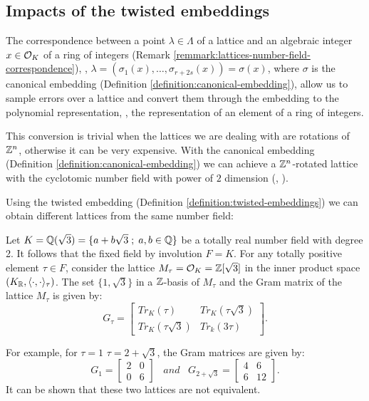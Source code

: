 \documentclass[a4paper,12pt]{article}
\begin{document}
\subsection{Impacts of the twisted embeddings}
\label{sec:org032194b}

   \begin{text}
  The correspondence between a point $\lambda \in \Lambda$ of a lattice and an algebraic
  integer $x \in \mathcal{O}_K$ of a ring of integers (Remark \ref{remmark:lattices-number-field-correspondence}),
  \ie, $\lambda = (\sigma_1(x), \dots, \sigma_{r+2s}(x)) = \sigma(x)$, where $\sigma$ is the
  canonical embedding (Definition \ref{definition:canonical-embedding}), allow us to
  sample errors over a lattice and convert them through the embedding to the
  polynomial representation, \ie, the representation of an element of a ring of
  integers.

  This conversion is trivial when the lattices we are dealing with are rotations of
  $\mathbb{Z}^n$, otherwise it can be very expensive. With the canonical embedding
  (Definition \ref{definition:canonical-embedding}) we can achieve a $\mathbb{Z}^n$-rotated
  lattice with the cyclotomic number field with power of $2$ dimension
  (\cite{Lyubashevsky2010}, \cite{DucasDurmos2012}).

  Using the twisted embedding (Definition \ref{definition:twisted-embeddings}) we can obtain
  different lattices from the same number field:

\end{text}

   \begin{example}\label{example:twisted-embeddings-generating-different-lattices-from-the-same-ring}
  Let $K = \mathbb{Q}(\sqrt{3}) = \{a + b\sqrt{3} \;;\; a,b \in \mathbb{Q}\}$ be a totally
  real number field with degree 2. It follows that the fixed field by
  involution $F=K$. For any totally positive element $\tau \in F$, consider
  the lattice $M_\tau = \mathcal{O}_K = \mathbb{Z}[\sqrt{3}]$ in the inner product space
  $(K_{\mathbb{R}},\langle \cdot,\cdot \rangle_\tau)$. The set $\{1,\sqrt{3}\}$ in a
  $\mathbb{Z}$-basis of $M_\tau$ and the Gram matrix of the lattice $M_\tau$ is given by:
  \[G_\tau =
    \begin{bmatrix}
      Tr_K(\tau) & Tr_K(\tau\sqrt{3}) \\
      Tr_K(\tau\sqrt{3}) & Tr_k(3\tau)
    \end{bmatrix}.
  \]

  For example, for $\tau = 1$  $\tau = 2 + \sqrt{3}$, the Gram matrices are
  given by:
  \[
    G_1 =
    \begin{bmatrix}
      2 & 0 \\
      0 & 6
    \end{bmatrix}
    \;\;\;and\;\;\;
    G_{2+\sqrt{3}} =
    \begin{bmatrix}
      4 & 6 \\
      6 & 12
    \end{bmatrix}.
  \]
  It can be shown that these two lattices are not equivalent.
\end{example}
\end{document}
